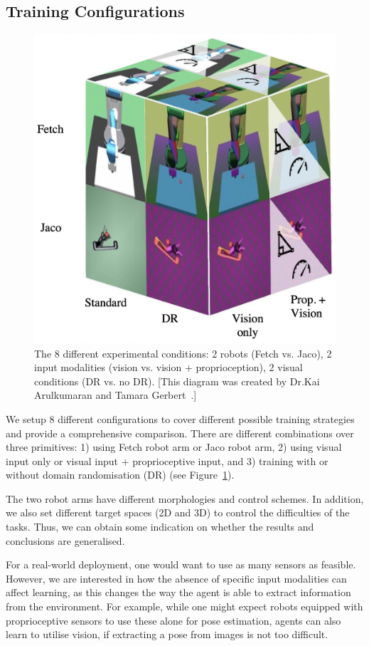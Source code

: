 \subsection{Training Configurations}
\begin{figure}[h!]
  \centering
  \includegraphics[width=0.85\linewidth]{figures/chapter6/axes.png}
  \caption[Visualisation of 8 different experimental conditions.]{The 8 different experimental conditions: 2 robots (Fetch vs. Jaco), 2 input modalities (vision vs. vision + proprioception), 2 visual conditions (DR vs. no DR). [This diagram was created by Dr.Kai Arulkumaran and Tamara Gerbert~\cite{dai2022analysing}.]}
  \label{fig:axes}
\end{figure}
We setup 8 different configurations to cover different possible training strategies and provide a comprehensive comparison. There are different combinations over three primitives: 1) using Fetch robot arm or Jaco robot arm, 2) using visual input only or visual input + proprioceptive input, and 3) training with or without domain randomisation (DR) (see Figure~\ref{fig:axes}).

{The two robot arms have different morphologies and control schemes. In addition,  we also set different target spaces (2D and 3D) to control the difficulties of the tasks. Thus, we can obtain some indication on whether the results and conclusions are generalised.}

For a real-world deployment, one would want to use as many sensors as feasible. However, we are interested in how the absence of specific input modalities can affect learning, as this changes the way the agent is able to extract information from the environment. For example, while one might expect robots equipped with proprioceptive sensors to use these alone for pose estimation, agents can also learn to utilise vision, if extracting a pose from images is not too difficult.

